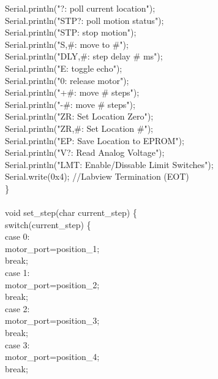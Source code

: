 {\tabto*{.5cm}	Serial.println("?:      poll current location");\\
\tabto*{.5cm}	Serial.println("STP?:   poll motion status");\\
\tabto*{.5cm}	Serial.println("STP:    stop motion");\\
\tabto*{.5cm}	Serial.println("S,\#:    move to \#");\\
\tabto*{.5cm}	Serial.println("DLY,\#:  step delay \# ms");\\
\tabto*{.5cm}	Serial.println("E:      toggle echo");\\
\tabto*{.5cm}	Serial.println("0:      release motor");\\
\tabto*{.5cm}	Serial.println("+\#:     move \# steps");\\
\tabto*{.5cm}	Serial.println("-\#:     move \# steps");\\
\tabto*{.5cm}	Serial.println("ZR:     Set Location Zero");\\
\tabto*{.5cm}	Serial.println("ZR,\#:   Set Location \#");\\
\tabto*{.5cm}	Serial.println("EP:     Save Location to EPROM");\\
\tabto*{.5cm}	Serial.println("V?:     Read Analog Voltage");\\
\tabto*{.5cm}	Serial.println("LMT:    Enable/Dissable Limit Switches");\\
\tabto*{.5cm}	Serial.write(0x4);  \tabto*{7.5cm}//Labview Termination (EOT)\\
\}\\
\\
void set\_step(char current\_step) \{\\
\tabto*{.5cm}	switch(current\_step) \{ \\
\tabto*{1cm}		case 0:\\
\tabto*{1.5cm}		motor\_port=position\_1;\\
\tabto*{1.5cm}		break;\\		
\tabto*{1cm}		case 1:\\
\tabto*{1.5cm}		motor\_port=position\_2;\\
\tabto*{1.5cm}		break;\\		
\tabto*{1cm}		case 2:\\
\tabto*{1.5cm}		motor\_port=position\_3;\\
\tabto*{1.5cm}		break;\\		
\tabto*{1cm}		case 3:\\
\tabto*{1.5cm}		motor\_port=position\_4;\\
\tabto*{1.5cm}		break;\\		
}
